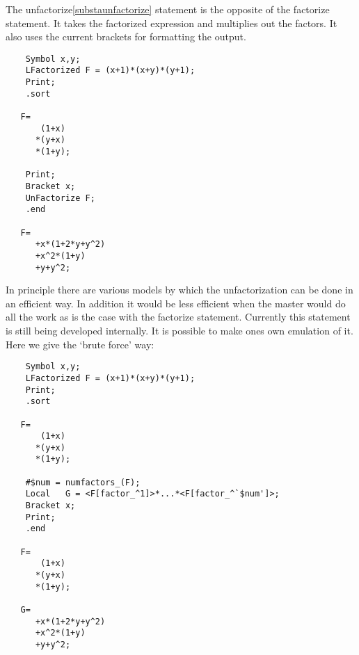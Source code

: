 \noindent The unfactorize\ref{substaunfactorize} statement is the opposite 
of the factorize statement. It takes the factorized expression and 
multiplies out the factors. It also uses the current brackets for 
formatting the output.
\begin{verbatim}
    Symbol x,y;
    LFactorized F = (x+1)*(x+y)*(y+1);
    Print;
    .sort

   F=
       (1+x)
      *(y+x)
      *(1+y);

    Print;
    Bracket x;
    UnFactorize F;
    .end

   F=
      +x*(1+2*y+y^2)
      +x^2*(1+y)
      +y+y^2;
\end{verbatim}
\noindent In principle there are various models by which the 
unfactorization can be done in an efficient way. In addition it would be 
less efficient when the master would do all the work as is the case with 
the factorize statement. Currently this statement is still being developed 
internally. It is possible to make ones own emulation of it. Here we give 
the `brute force' way:
\begin{verbatim}
    Symbol x,y;
    LFactorized F = (x+1)*(x+y)*(y+1);
    Print;
    .sort

   F=
       (1+x)
      *(y+x)
      *(1+y);

    #$num = numfactors_(F);
    Local   G = <F[factor_^1]>*...*<F[factor_^`$num']>;
    Bracket x;
    Print;
    .end

   F=
       (1+x)
      *(y+x)
      *(1+y);

   G=
      +x*(1+2*y+y^2)
      +x^2*(1+y)
      +y+y^2;
\end{verbatim}

